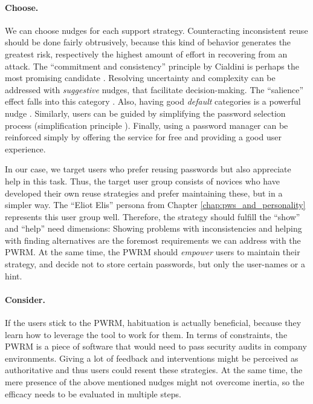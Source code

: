 \paragraph{Choose.} We can choose nudges for each support strategy. Counteracting inconsistent reuse should be done fairly obtrusively, because this kind of behavior generates the greatest risk, respectively the highest amount of effort in recovering from an attack. The ``commitment and consistency'' principle by Cialdini is perhaps the most promising candidate \cite{Cialdini2007Influence}. Resolving uncertainty and complexity can be addressed with \textit{suggestive} nudges, that facilitate decision-making. The ``salience'' effect falls into this category \cite{Coventry2014SCENEBehavioralNudges}. Also, having good \textit{default} categories is a powerful nudge \cite{Cranor2008FrameworkReasoning}. Similarly, users can be guided by simplifying the password selection process (simplification principle \cite{Forget2007PersuasionEducationSecurity}). Finally, using a password manager can be reinforced simply by offering the service for free and providing a good user experience. 

In our case, we target users who prefer reusing passwords but also appreciate help in this task. Thus, the target user group consists of novices who have developed their own reuse strategies and prefer maintaining these, but in a simpler way. The ``Eliot Elis'' persona from Chapter \ref{chap:pws_and_personality} represents this user group well. Therefore, the strategy should fulfill the ``show'' and ``help'' need dimensions: Showing problems with inconsistencies and helping with finding alternatives are the foremost requirements we can address with the PWRM. At the same time, the PWRM should \textit{empower} users to maintain their strategy, and decide not to store certain passwords, but only the user-names or a hint. 

\paragraph{Consider.}
If the users stick to the PWRM, habituation is actually beneficial, because they learn how to leverage the tool to work for them. In terms of constraints, the PWRM is a piece of software that would need to pass security audits in company environments. Giving a lot of feedback and interventions might be perceived as authoritative and thus users could resent these strategies. At the same time, the mere presence of the above mentioned nudges might not overcome inertia, so the efficacy needs to be evaluated in multiple steps. 

